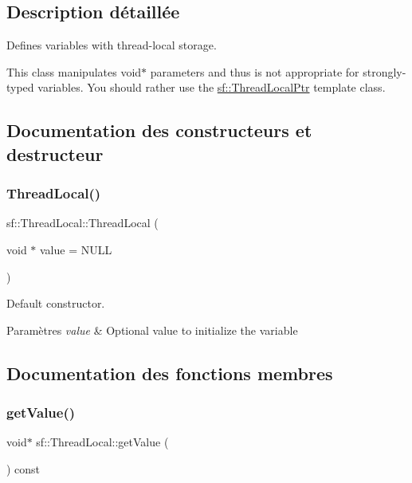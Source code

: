 \subsection{Description détaillée}
Defines variables with thread-\/local storage. 

This class manipulates void$\ast$ parameters and thus is not appropriate for strongly-\/typed variables. You should rather use the \hyperlink{classsf_1_1ThreadLocalPtr}{sf\+::\+Thread\+Local\+Ptr} template class. 

\subsection{Documentation des constructeurs et destructeur}
\mbox{\label{classsf_1_1ThreadLocal_a44ea3c4be4eef118080275cbf4cf04cd}} 
\subsubsection{\texorpdfstring{Thread\+Local()}{ThreadLocal()}}
{\footnotesize\ttfamily sf\+::\+Thread\+Local\+::\+Thread\+Local (\begin{DoxyParamCaption}\item[{void $\ast$}]{value = {\ttfamily NULL} }\end{DoxyParamCaption})}



Default constructor. 


\begin{DoxyParams}{Paramètres}
{\em value} & Optional value to initialize the variable \\
\hline
\end{DoxyParams}


\subsection{Documentation des fonctions membres}
\mbox{\label{classsf_1_1ThreadLocal_ad68823496eb065b4b695c3468fa869bc}} 
\subsubsection{\texorpdfstring{get\+Value()}{getValue()}}
{\footnotesize\ttfamily void$\ast$ sf\+::\+Thread\+Local\+::get\+Value (\begin{DoxyParamCaption}{ }\end{DoxyParamCaption}) const}



